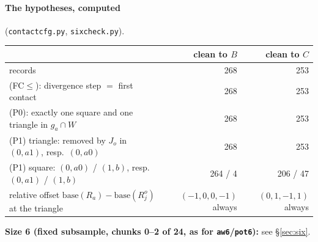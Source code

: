 \documentclass[11pt]{article}
\theoremstyle{definition}\newtheorem{definition}[theorem]{Definition}\newtheorem{remark}[theorem]{Remark}
\begin{document}
\paragraph{The hypotheses, computed} (\texttt{contactcfg.py}, \texttt{sixcheck.py}).
\begin{center}\begin{tabular}{lrr}\toprule
 & clean to $B$ & clean to $C$\\\midrule
records & 268 & 253\\
(FC$\le$): divergence step $=$ first contact & 268 & 253\\
(P0): exactly one square and one triangle in $g_a\cap W$ & 268 & 253\\
(P1) triangle: removed by $J_o$ in $(0,a1)$, resp.\ $(0,a0)$ & 268 & 253\\
(P1) square: $(0,a0)$ / $(1,b)$, resp.\ $(0,a1)$ / $(1,b)$ & 264 / 4 & 206 / 47\\
relative offset $\mathrm{base}(R_a)-\mathrm{base}(R^o_j)$ at the triangle & $(-1,0,0,-1)$ always & $(0,1,-1,1)$ always\\\bottomrule
\end{tabular}\end{center}
\textbf{Size 6 (fixed subsample, chunks 0--2 of 24, as for \texttt{aw6}/\texttt{pot6}):} see \S\ref{sec:six}.
\end{document}
